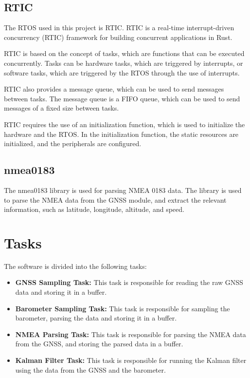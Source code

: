 \subsection{RTIC}
The RTOS used in this project is RTIC.%
RTIC is a real-time interrupt-driven concurrency (RTIC) framework for building concurrent applications in Rust.

RTIC is based on the concept of tasks, which are functions that can be executed concurrently.
Tasks can be hardware tasks, which are triggered by interrupts, or software tasks, which are triggered by the RTOS through the use of interrupts.

RTIC also provides a message queue, which can be used to send messages between tasks.
The message queue is a FIFO queue, which can be used to send messages of a fixed size between tasks.

RTIC requires the use of an initialization function, which is used to initialize the hardware and the RTOS.
In the initialization function, the static resources are initialized, and the peripherals are configured.
\subsection{nmea0183}
The nmea0183 library is used for parsing NMEA 0183 data.
The library is used to parse the NMEA data from the GNSS module, and extract the relevant information, such as latitude, longitude, altitude, and speed.%

\section{Tasks}
The software is divided into the following tasks:
\begin{itemize}
    \item \textbf{GNSS Sampling Task:} This task is responsible for reading the raw GNSS data and storing it in a buffer.
    \item \textbf{Barometer Sampling Task:} This task is responsible for sampling the barometer, parsing the data and storing it in a buffer.
    \item \textbf{NMEA Parsing Task:} This task is responsible for parsing the NMEA data from the GNSS, and storing the parsed data in a buffer.
    \item \textbf{Kalman Filter Task:} This task is responsible for running the Kalman filter using the data from the GNSS and the barometer.
\end{itemize}

